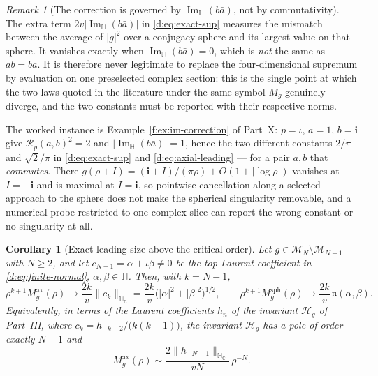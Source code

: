 \documentclass[11pt,a4paper]{article}
\numberwithin{equation}{section}
\newtheorem{corollary}[theorem]{Corollary}
\theoremstyle{definition}
\theoremstyle{remark}
\newtheorem{remark}[theorem]{Remark}
\theoremstyle{plain}
\newcommand{\HH}{\mathbb H}
\newcommand{\HC}{\mathbb H_{\mathbb C}}
\DeclareMathOperator{\Ima}{Im}
\newcommand{\ImH}{\Ima_{\HH}}
\newcommand{\Rp}{\mathcal R_{p}}      %
\newcommand{\Hg}{\mathcal H_{g}}      %
\newcommand{\nn}{\mathfrak n}         %
\newcommand{\Msph}{M^{\mathrm{sph}}}                  %
\newcommand{\Max}{M^{\mathrm{ax}}}                    %
\newcommand{\abs}[1]{\lvert #1\rvert}
\newcommand{\norm}[1]{\lVert #1\rVert}
\begin{document}
\begin{remark}[The correction is governed by $\ImH(b\bar a)$, not by
commutativity]
\label{d:rem:correction}
The extra term $2v\abs{\ImH(b\bar a)}$ in \eqref{d:eq:exact-sup} measures
the mismatch between the average of $\abs g^2$ over a conjugacy sphere and
its largest value on that sphere.  It vanishes exactly when
$\ImH(b\bar a)=0$, which is \emph{not} the same as $ab=ba$.  It is
therefore never legitimate to replace the four-dimensional supremum by
evaluation on one preselected complex section: this is the single point at
which the two laws quoted in the literature under the same symbol $M_g$
genuinely diverge, and the two constants must be reported with their
respective norms.
\end{remark}

The worked instance is Example~\ref{f:ex:im-correction} of Part~X:
$p=\iota$, $a=1$, $b=\mathbf i$ give $\Rp(a,b)^2=2$ and
$\abs{\ImH(b\bar a)}=1$, hence the two different constants $2/\pi$ and
$\sqrt2/\pi$ in \eqref{d:eq:exact-sup} and \eqref{d:eq:axial-leading} ---
for a pair $a,b$ that \emph{commutes}.  There
$g(\rho+I)=(\mathbf i+I)/(\pi\rho)+O(1+\abs{\log\rho})$ vanishes at
$I=-\mathbf i$ and is maximal at $I=\mathbf i$, so pointwise cancellation
along a selected approach to the sphere does not make the spherical
singularity removable, and a numerical probe restricted to one complex
slice can report the wrong constant or no singularity at all.

\begin{corollary}[Exact leading size above the critical order]
\label{d:cor:higher-order}
Let $g\in\mathcal M_N\setminus\mathcal M_{N-1}$ with $N\ge2$, and let
$c_{N-1}=\alpha+\iota\beta\ne0$ be the top Laurent coefficient in
\eqref{d:eq:finite-normal}, $\alpha,\beta\in\HH$.  Then, with $k=N-1$,
\begin{equation}
 \rho^{k+1}\Max_g(\rho)\longrightarrow
 \frac{2k}{v}\norm{c_k}_{\HC}
 =\frac{2k}{v}\bigl(\abs\alpha^2+\abs\beta^2\bigr)^{1/2},
 \qquad
 \rho^{k+1}\Msph_g(\rho)\longrightarrow
 \frac{2k}{v}\,\nn(\alpha,\beta) .
 \label{d:eq:pole-asymptotic}
\end{equation}
Equivalently, in terms of the Laurent coefficients $h_n$ of the invariant
$\Hg$ of Part~III, where $c_k=h_{-k-2}/\bigl(k(k+1)\bigr)$, the invariant
$\Hg$ has a pole of order exactly $N+1$ and
\begin{equation}
 \Max_g(\rho)\sim\frac{2\norm{h_{-N-1}}_{\HC}}{vN}\,\rho^{-N}.
 \label{d:eq:J-asymptotic}
\end{equation}
\end{corollary}
\end{document}
